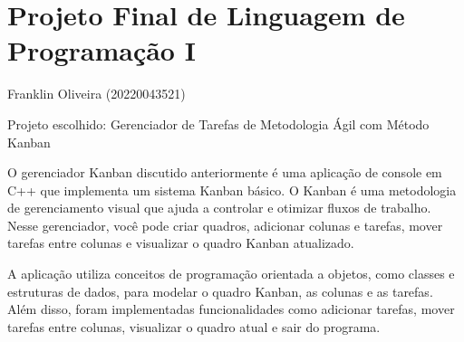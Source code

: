 \chapter{Projeto Final de Linguagem de Programação I}
\hypertarget{md__r_e_a_d_m_e}{}\label{md__r_e_a_d_m_e}
\label{md__r_e_a_d_m_e_autotoc_md0}%
%
Franklin Oliveira (20220043521)

Projeto escolhido\+: Gerenciador de Tarefas de Metodologia Ágil com Método Kanban

O gerenciador Kanban discutido anteriormente é uma aplicação de console em C++ que implementa um sistema Kanban básico. O Kanban é uma metodologia de gerenciamento visual que ajuda a controlar e otimizar fluxos de trabalho. Nesse gerenciador, você pode criar quadros, adicionar colunas e tarefas, mover tarefas entre colunas e visualizar o quadro Kanban atualizado.

A aplicação utiliza conceitos de programação orientada a objetos, como classes e estruturas de dados, para modelar o quadro Kanban, as colunas e as tarefas. Além disso, foram implementadas funcionalidades como adicionar tarefas, mover tarefas entre colunas, visualizar o quadro atual e sair do programa. 